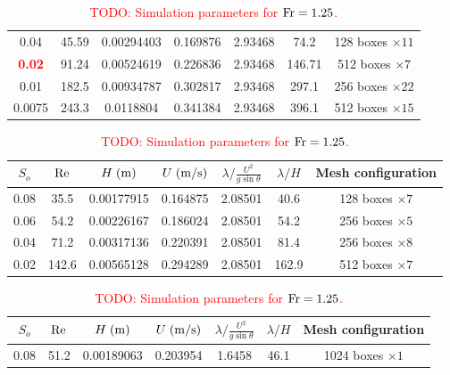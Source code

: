 \documentclass[a4paper]{article}
\newcommand{\fr}{{\rm{Fr}}}
\newcommand{\sa}{\sin\theta}
\begin{document}
\begin{table}[htbp]
\begin{subtable}{1\textwidth}
\begin{tabular}{ccccccc}
			0.04 & 45.59 & 0.00294403 & 0.169876 & 2.93468 & 74.2 & 128 boxes $\times 11$\\
			
			\textcolor{red}{\bf 0.02} & 91.24 & 0.00524619 & 0.226836 & 2.93468 & 146.71 & 512 boxes $\times 7$\\
			
			0.01 & 182.5 & 0.00934787 & 0.302817 & 2.93468 & 297.1 & 256 boxes $\times 22$\\
			
			0.0075 & 243.3 & 0.0118804 & 0.341384 & 2.93468 & 396.1 & 512 boxes $\times 15$\\
			\bottomrule 
		\end{tabular}
		\caption{Simulation parameters for $\fr=1.00$.}
		\label{params_1}
	\end{subtable}

	\vspace{0.25cm}
	
	\begin{subtable}{1\textwidth}
		\centering
		\begin{tabular}{ccccccc}
			$S_o$ & $\rm Re$ & $H\;{\rm (m)}$ & $U\;{\rm (m/s)}$ & $\lambda/\frac{U^2}{g\sa}$ & $\lambda/H$ & Mesh configuration\\
			\toprule
			0.08 & 35.5 & 0.00177915 & 0.164875 & 2.08501 & 40.6 & 128 boxes $\times 7$\\
			
			0.06 & 54.2 & 0.00226167 & 0.186024 & 2.08501 & 54.2 & 256 boxes $\times 5$\\
			
			0.04 & 71.2 & 0.00317136 & 0.220391 & 2.08501 & 81.4 & 256 boxes $\times 8$\\
			
			0.02 & 142.6 & 0.00565128 & 0.294289 & 2.08501 & 162.9 & 512 boxes $\times 7$\\
			\bottomrule 
		\end{tabular}
		\caption{\textcolor{red}{TODO: Simulation parameters for $\fr=1.25$.}}
		\label{params_125}
	\end{subtable}
	
	\vspace{0.25cm}

	\begin{subtable}{1\textwidth}
		\centering
		\begin{tabular}{ccccccc}
			$S_o$ & $\rm Re$ & $H\;{\rm (m)}$ & $U\;{\rm (m/s)}$ & $\lambda/\frac{U^2}{g\sa}$ & $\lambda/H$ & Mesh configuration\\
			\toprule
			0.08 & 51.2 & 0.00189063 & 0.203954 & 1.6458 & 46.1 & 1024 boxes $\times 1$\\
			

\end{tabular}
\end{subtable}
\end{table}
\end{document}
